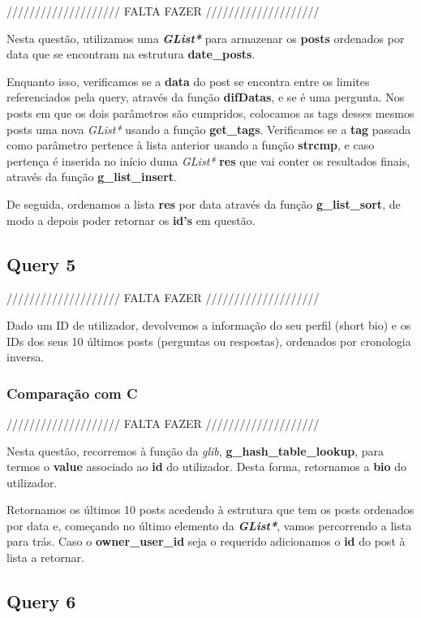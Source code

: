 \documentclass[a4paper]{article}
\begin{document}
//////////////////// FALTA FAZER ////////////////////

Nesta questão, utilizamos uma \textit{\textbf{GList*}} para armazenar 
os \textbf{posts} ordenados por data que se encontram na estrutura 
\textbf{date\_posts}.

Enquanto isso, verificamos se a \textbf{data} do post se encontra entre 
os limites referenciados pela query, através da função \textbf{difDatas},
e se é uma pergunta. Nos posts em que os dois parâmetros são cumpridos,
colocamos as tags desses mesmos posts uma nova \textit{GList*}
usando a função \textbf{get\_tags}. Verificamos se a \textbf{tag} passada 
como parâmetro pertence à lista anterior usando a função \textbf{strcmp},
e caso pertença é inserida no início duma \textit{GList*} \textbf{res} 
que vai conter os resultados finais, através da função 
\textbf{g\_list\_insert}.

De seguida, ordenamos a lista \textbf{res} por data através da função
\textbf{g\_list\_sort}, de modo a depois poder retornar os \textbf{id's}
em questão.

\subsection{Query 5}

//////////////////// FALTA FAZER ////////////////////

Dado um ID de utilizador, devolvemos a informação do seu perfil (short 
bio) e os IDs dos seus 10 últimos posts (perguntas ou respostas), 
ordenados por cronologia inversa.

\subsubsection{Comparação com C}

//////////////////// FALTA FAZER ////////////////////

Nesta questão, recorremos à função da \textit{glib}, 
\textbf{g\_hash\_table\_lookup}, para termos o \textbf{value} 
associado ao \textbf{id} do utilizador. Desta forma, retornamos a 
\textbf{bio} do utilizador.

Retornamos os últimos 10 posts acedendo à estrutura que tem os posts
ordenados por data e, começando no último elemento da \textit{
\textbf{GList*}}, vamos percorrendo a lista para trás. Caso o 
\textbf{owner\_user\_id} seja o requerido adicionamos o \textbf{id} 
do post à lista a retornar.

\subsection{Query 6}
\end{document}

